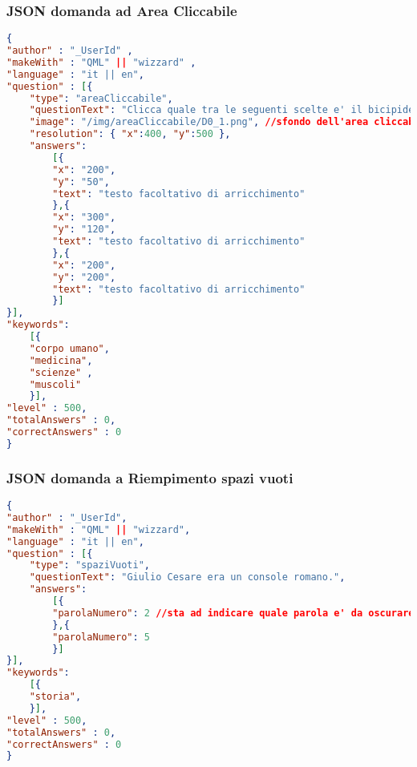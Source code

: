 \subsubsection{JSON domanda ad Area Cliccabile}
\begin{lstlisting}[language=json,firstnumber=1]
{
"author" : "_UserId" ,
"makeWith" : "QML" || "wizzard" ,
"language" : "it || en", 
"question" : [{
	"type": "areaCliccabile",
	"questionText": "Clicca quale tra le seguenti scelte e' il bicipide.",
	"image": "/img/areaCliccabile/D0_1.png", //sfondo dell'area cliccabile
	"resolution": { "x":400, "y":500 },
	"answers":
		[{
		"x": "200",
		"y": "50",
		"text": "testo facoltativo di arricchimento"
		},{
		"x": "300",
		"y": "120",
		"text": "testo facoltativo di arricchimento"
		},{
		"x": "200",
		"y": "200",
		"text": "testo facoltativo di arricchimento"
		}]
}],
"keywords":
	[{
	"corpo umano",
	"medicina",
	"scienze" ,
	"muscoli"
	}],
"level" : 500,
"totalAnswers" : 0,
"correctAnswers" : 0
}
\end{lstlisting}

\subsubsection{JSON domanda a Riempimento spazi vuoti}
\begin{lstlisting}[language=json,firstnumber=1]
{
"author" : "_UserId",
"makeWith" : "QML" || "wizzard",
"language" : "it || en",
"question" : [{
	"type": "spaziVuoti",
	"questionText": "Giulio Cesare era un console romano.",
	"answers":
		[{
		"parolaNumero": 2 //sta ad indicare quale parola e' da oscurare. In questo caso la numero 2
		},{
		"parolaNumero": 5
		}]
}],
"keywords":
	[{
	"storia",
	}],
"level" : 500,
"totalAnswers" : 0,
"correctAnswers" : 0
}
\end{lstlisting}
